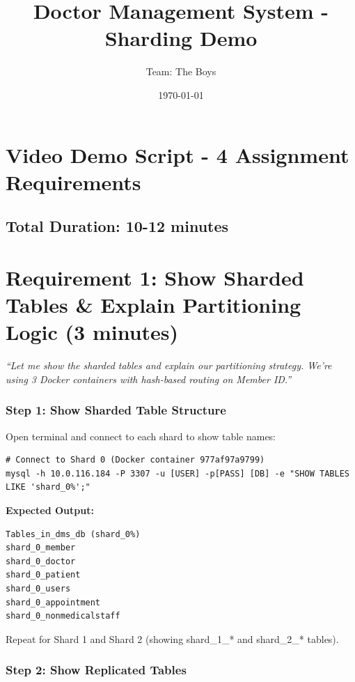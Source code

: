 \documentclass[12pt]{article}
\title{\textbf{Doctor Management System - Sharding Demo}}
\author{Team: The Boys}
\date{\today}
\begin{document}
\maketitle

\section*{Video Demo Script - 4 Assignment Requirements}

\subsection*{Total Duration: 10-12 minutes}

\vspace{1em}

\section{Requirement 1: Show Sharded Tables \& Explain Partitioning Logic (3 minutes)}

\textit{``Let me show the sharded tables and explain our partitioning strategy. We're using 3 Docker containers with hash-based routing on Member ID.''}

\subsubsection*{Step 1: Show Sharded Table Structure}

Open terminal and connect to each shard to show table names:

\begin{lstlisting}
# Connect to Shard 0 (Docker container 977af97a9799)
mysql -h 10.0.116.184 -P 3307 -u [USER] -p[PASS] [DB] -e "SHOW TABLES LIKE 'shard_0%';"
\end{lstlisting}

\textbf{Expected Output:}
\begin{lstlisting}
Tables_in_dms_db (shard_0%)
shard_0_member
shard_0_doctor
shard_0_patient
shard_0_users
shard_0_appointment
shard_0_nonmedicalstaff
\end{lstlisting}

Repeat for Shard 1 and Shard 2 (showing shard_1_* and shard_2_* tables).

\subsubsection*{Step 2: Show Replicated Tables}
\end{document}
